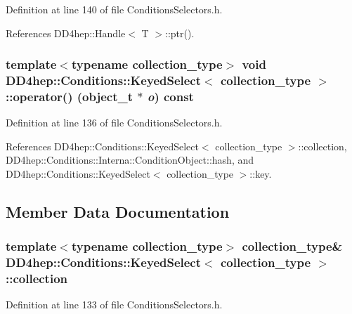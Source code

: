 Definition at line 140 of file ConditionsSelectors.h.

References DD4hep::Handle$<$ T $>$::ptr().\hypertarget{class_d_d4hep_1_1_conditions_1_1_keyed_select_a9a83019127f78290ed5069790aeb855e}{
\subsubsection[{operator()}]{\setlength{\rightskip}{0pt plus 5cm}template$<$typename collection\_\-type$>$ void {\bf DD4hep::Conditions::KeyedSelect}$<$ collection\_\-type $>$::operator() ({\bf object\_\-t} $\ast$ {\em o}) const}}
\label{class_d_d4hep_1_1_conditions_1_1_keyed_select_a9a83019127f78290ed5069790aeb855e}


Definition at line 136 of file ConditionsSelectors.h.

References DD4hep::Conditions::KeyedSelect$<$ collection\_\-type $>$::collection, DD4hep::Conditions::Interna::ConditionObject::hash, and DD4hep::Conditions::KeyedSelect$<$ collection\_\-type $>$::key.

\subsection{Member Data Documentation}
\hypertarget{class_d_d4hep_1_1_conditions_1_1_keyed_select_ace147c1925f1b99fd5582e1a251e6bbd}{
\subsubsection[{collection}]{\setlength{\rightskip}{0pt plus 5cm}template$<$typename collection\_\-type$>$ collection\_\-type\& {\bf DD4hep::Conditions::KeyedSelect}$<$ collection\_\-type $>$::{\bf collection}}}
\label{class_d_d4hep_1_1_conditions_1_1_keyed_select_ace147c1925f1b99fd5582e1a251e6bbd}


Definition at line 133 of file ConditionsSelectors.h.

